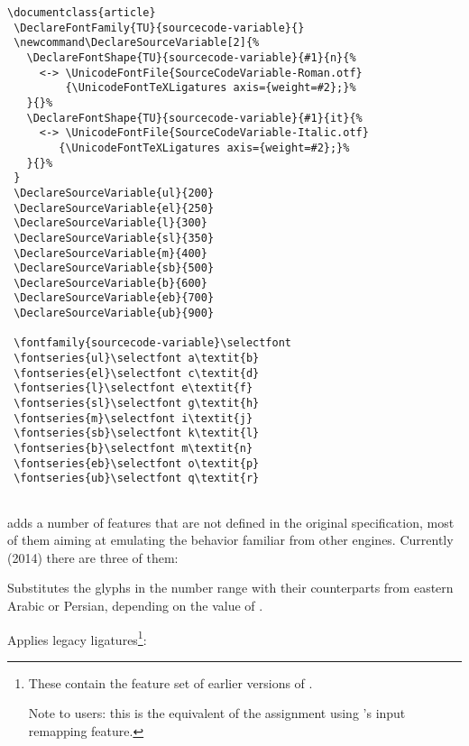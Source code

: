   \begin{lstlisting}[columns=fullflexible]
\documentclass{article}
 \DeclareFontFamily{TU}{sourcecode-variable}{}
 \newcommand\DeclareSourceVariable[2]{%
   \DeclareFontShape{TU}{sourcecode-variable}{#1}{n}{%
     <-> \UnicodeFontFile{SourceCodeVariable-Roman.otf}
         {\UnicodeFontTeXLigatures axis={weight=#2};}%
   }{}%
   \DeclareFontShape{TU}{sourcecode-variable}{#1}{it}{%
     <-> \UnicodeFontFile{SourceCodeVariable-Italic.otf}
        {\UnicodeFontTeXLigatures axis={weight=#2};}%
   }{}%
 }
 \DeclareSourceVariable{ul}{200}
 \DeclareSourceVariable{el}{250}
 \DeclareSourceVariable{l}{300}
 \DeclareSourceVariable{sl}{350}
 \DeclareSourceVariable{m}{400}
 \DeclareSourceVariable{sb}{500}
 \DeclareSourceVariable{b}{600}
 \DeclareSourceVariable{eb}{700}
 \DeclareSourceVariable{ub}{900}
 
 \fontfamily{sourcecode-variable}\selectfont
 \fontseries{ul}\selectfont a\textit{b}
 \fontseries{el}\selectfont c\textit{d}
 \fontseries{l}\selectfont e\textit{f}
 \fontseries{sl}\selectfont g\textit{h}
 \fontseries{m}\selectfont i\textit{j}
 \fontseries{sb}\selectfont k\textit{l}
 \fontseries{b}\selectfont m\textit{n}
 \fontseries{eb}\selectfont o\textit{p}
 \fontseries{ub}\selectfont q\textit{r}
 
\end{lstlisting}

  \enddescriptions

\endsubsection

 adds a number of features that are not defined
in the original \OpenType specification, most of them
aiming at emulating the behavior familiar from other \TEX engines.
%
Currently (2014) there are three of them:

\begindescriptions

          Substitutes the glyphs in the  number range
          with their counterparts from eastern Arabic or Persian,
          depending on the value of .
  \endaltitem

          Applies legacy \TEX ligatures\footnote{%
            These contain the feature set  of earlier
            versions of .

            Note to \XETEX users: this is the equivalent of the
            assignment  using \XETEX's input
            remapping feature.
          }:

